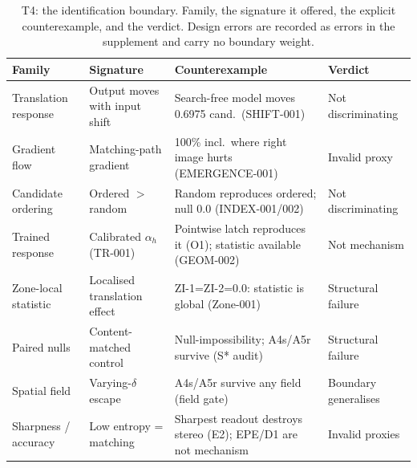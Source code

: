 \documentclass[conference]{IEEEtran}
\begin{document}
\begin{table}[t]
\centering
\caption{T4: the identification boundary. Family, the signature it offered, the explicit counterexample, and the verdict. Design errors are recorded as errors in the supplement and carry no boundary weight.}
\label{tab:t4}
\begin{tabular}{p{2.0cm}p{2.4cm}p{2.5cm}l}
\toprule
Family & Signature & Counterexample & Verdict \\
\midrule
Translation response & Output moves with input shift & Search-free model moves 0.6975 cand.\ (SHIFT-001) & Not discriminating \\
Gradient flow & Matching-path gradient & 100\% incl.\ where right image hurts (EMERGENCE-001) & Invalid proxy \\
Candidate ordering & Ordered $>$ random & Random reproduces ordered; null 0.0 (INDEX-001/002) & Not discriminating \\
Trained response & Calibrated $\alpha_h$ (TR-001) & Pointwise latch reproduces it (O1); statistic available (GEOM-002) & Not mechanism \\
Zone-local statistic & Localised translation effect & ZI-1=ZI-2=0.0: statistic is global (Zone-001) & Structural failure \\
Paired nulls & Content-matched control & Null-impossibility; A4s/A5r survive (S* audit) & Structural failure \\
Spatial field & Varying-$\delta$ escape & A4s/A5r survive any field (field gate) & Boundary generalises \\
Sharpness / accuracy & Low entropy = matching & Sharpest readout destroys stereo (E2); EPE/D1 are not mechanism & Invalid proxies \\
\bottomrule
\end{tabular}
\end{table}
\end{document}
